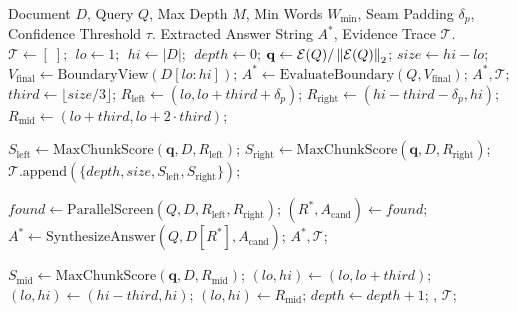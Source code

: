 \begin{algorithm}[t]
\caption{Recursive Boundary Exposure Retrieval (\RBER)}
\label{alg:rber}
\begin{footnotesize}
\begin{algorithmic}[1]
\REQUIRE Document $D$, Query $Q$, Max Depth $M$, Min Words $W_{\text{min}}$, Seam Padding $\delta_p$, Confidence Threshold $\tau$.
\ENSURE Extracted Answer String $A^*$, Evidence Trace $\mathcal{T}$.
\STATE $\mathcal{T} \leftarrow [\;]$; $\;lo \leftarrow 1$; $\;hi \leftarrow |D|$; $\;depth \leftarrow 0$;
\STATE $\mathbf{q} \leftarrow \mathcal{E}(Q) / \left\lVert\mathcal{E}(Q)\right\rVert_2$;
    \STATE $size \leftarrow hi - lo$;
        \STATE $V_{\text{final}} \leftarrow \text{BoundaryView}(D[lo:hi])$;
        \STATE $A^* \leftarrow \text{EvaluateBoundary}(Q, V_{\text{final}})$;
        \RETURN $A^*, \mathcal{T}$;
    \ENDIF
    \STATE $third \leftarrow \lfloor size / 3 \rfloor$;
    \STATE $R_{\text{left}} \leftarrow (lo, lo + third + \delta_p)$;
    \STATE $R_{\text{right}} \leftarrow (hi - third - \delta_p, hi)$;
    \STATE $R_{\text{mid}} \leftarrow (lo + third, lo + 2 \cdot third)$;
    
    \STATE $S_{\text{left}} \leftarrow \text{MaxChunkScore}(\mathbf{q}, D, R_{\text{left}})$;
    \STATE $S_{\text{right}} \leftarrow \text{MaxChunkScore}(\mathbf{q}, D, R_{\text{right}})$;
    \STATE $\mathcal{T}\text{.append}(\{depth, size, S_{\text{left}}, S_{\text{right}}\})$;
    
    \STATE $found \leftarrow \text{ParallelScreen}(Q, D, R_{\text{left}}, R_{\text{right}})$;
        \STATE $(R^*, A_{\text{cand}}) \leftarrow found$;
        \STATE $A^* \leftarrow \text{SynthesizeAnswer}(Q, D[R^*], A_{\text{cand}})$;
        \RETURN $A^*, \mathcal{T}$;
    \ENDIF
    
    \STATE $S_{\text{mid}} \leftarrow \text{MaxChunkScore}(\mathbf{q}, D, R_{\text{mid}})$;
        \STATE $(lo, hi) \leftarrow (lo, lo + third)$;
        \STATE $(lo, hi) \leftarrow (hi - third, hi)$;
    \ELSE
        \STATE $(lo, hi) \leftarrow R_{\text{mid}}$;
    \ENDIF
    \STATE $depth \leftarrow depth + 1$;
\ENDWHILE
\RETURN {}, $\mathcal{T}$;
\end{algorithmic}
\end{footnotesize}
\end{algorithm}

